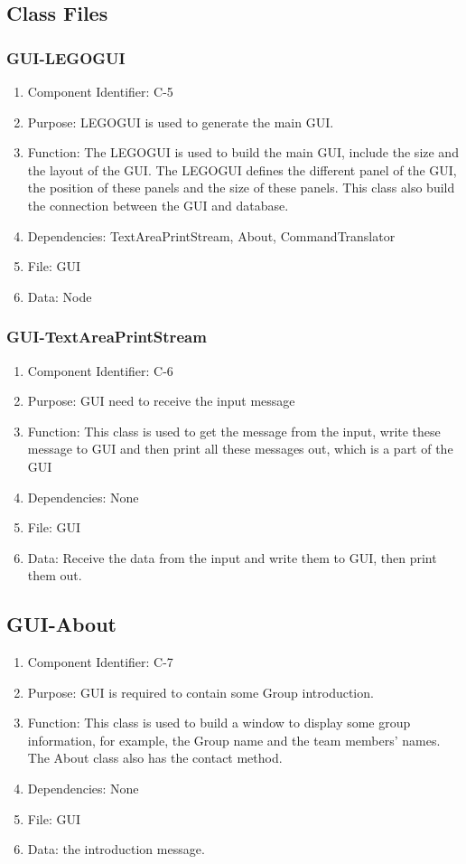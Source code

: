 \documentclass[11pt, a4paper]{report}
\begin{document}
\subsection{Class Files}
\subsubsection{GUI-LEGOGUI}
\begin{enumerate}
\item Component Identifier: C-5
\item Purpose: LEGOGUI is used to generate the main GUI. 
\item Function: The LEGOGUI is used to build the main GUI, include the size and the layout of the GUI. The LEGOGUI defines the different panel of the GUI, the position of these panels and the size of these panels. This class also build the connection between the GUI and database.
\item Dependencies: TextAreaPrintStream, About, CommandTranslator
\item File: GUI
\item Data: Node
\end{enumerate}

\subsubsection{GUI-TextAreaPrintStream}
\begin{enumerate}
\item Component Identifier: C-6
\item Purpose: GUI need to receive the input message
\item Function: This class is used to get the message from the input, write these message to GUI and then print all these messages out, which is a part of the GUI
\item Dependencies: None
\item File: GUI
\item Data: Receive the data from the input and  write them to GUI, then print them out.
\end{enumerate} 

\subsection{GUI-About}
\begin{enumerate}
\item Component Identifier: C-7
\item Purpose: GUI is required to contain some Group introduction.
\item Function: This class is used to build a window to display some group information, for example, the Group name and the team members' names. The About class also has the contact method.
\item Dependencies: None
\item File: GUI
\item Data: the introduction message.
\end{enumerate}
\end{document}

